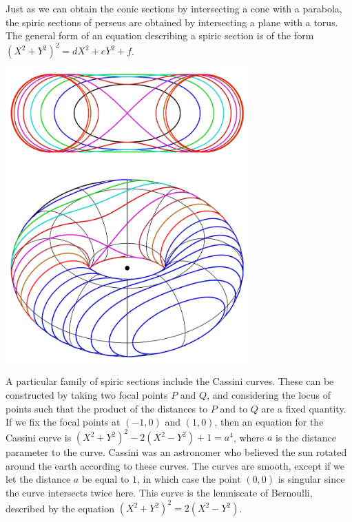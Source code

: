 \begin{example}
    Just as we can obtain the conic sections by intersecting a cone with a parabola, the spiric sections of perseus are obtained by intersecting a plane with a torus. The general form of an equation describing a spiric section is of the form $(X^2 + Y^2)^2 = dX^2 + eY^2 + f$.
    \begin{center}
        \includegraphics[width=0.7\textwidth]{SpiricSection.png}
    \end{center}
    A particular family of spiric sections include the Cassini curves. These can be constructed by taking two focal points $P$ and $Q$, and considering the locus of points such that the product of the distances to $P$ and to $Q$ are a fixed quantity. If we fix the focal points at $(-1,0)$ and $(1,0)$, then an equation for the Cassini curve is $(X^2 + Y^2)^2 - 2(X^2 - Y^2) + 1 = a^4$, where $a$ is the distance parameter to the curve. Cassini was an astronomer who believed the sun rotated around the earth according to these curves. The curves are smooth, except if we let the distance $a$ be equal to $1$, in which case the point $(0,0)$ is singular since the curve intersects twice here. This curve is the lemniscate of Bernoulli, described by the equation $(X^2 + Y^2)^2 = 2(X^2 - Y^2)$.
\end{example}

